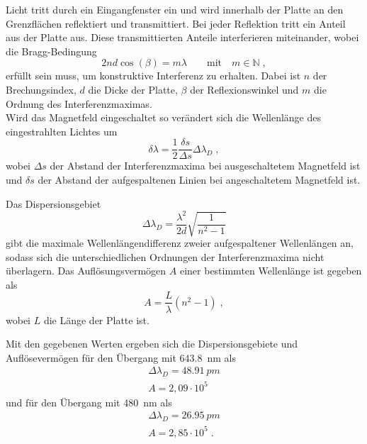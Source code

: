         Licht tritt durch ein Eingangfenster ein und wird innerhalb der Platte an den Grenzflächen reflektiert und transmittiert.
        Bei jeder Reflektion tritt ein Anteil aus der Platte aus.
        Diese transmittierten Anteile interferieren miteinander, wobei die Bragg-Bedingung
        \begin{equation}
            2 n d \cos(\beta) = m \lambda \qquad \text{mit} \quad m \in \mathbb{N} \;,
        \end{equation}
        erfüllt sein muss, um konstruktive Interferenz zu erhalten.
        Dabei ist $n$ der Brechungsindex, $d$ die Dicke der Platte, $\beta$ der Reflexionswinkel und $m$ die Ordnung des Interferenzmaximas.
        \\
        
        Wird das Magnetfeld eingeschaltet so verändert sich die Wellenlänge des eingestrahlten Lichtes um
        \begin{equation}
            \delta \lambda = \frac{1}{2} \frac{\delta s}{\Delta s} \Delta \lambda_D \;,
            \label{eqn:lambda}
        \end{equation}
        wobei $\Delta s$ der Abstand der Interferenzmaxima bei ausgeschaltetem Magnetfeld ist und $\delta s$ der Abstand der aufgespaltenen Linien bei angeschaltetem Magnetfeld ist.

        Das Dispersionsgebiet
        \begin{equation}
            \Delta \lambda_D = \frac{\lambda^2}{2 d} \sqrt{\frac{1}{n^2 - 1}}
        \end{equation}
        gibt die maximale Wellenlängendifferenz zweier aufgespaltener Wellenlängen an, sodass sich die unterschiedlichen Ordnungen der Interferenzmaxima nicht überlagern.
        Das Auflösungsvermögen $A$ einer bestimmten Wellenlänge ist gegeben als
        \begin{equation}
            A = \frac{L}{\lambda} (n^2 - 1) \;,
        \end{equation}
        wobei $L$ die Länge der Platte ist.
        
        Mit den gegebenen Werten ergeben sich die Dispersionsgebiete und Auflösevermögen für den Übergang mit \SI{643,8}{nm} als
        \begin{align*}
            \Delta \lambda_D = \SI{48,91}{pm} \\
            A = 2,09 \cdot 10^5
        \end{align*}
        und für den Übergang mit \SI{480}{nm} als
        \begin{align*}
            \Delta \lambda_D = \SI{26,95}{pm} \\
            A = 2,85 \cdot 10^5 \;.
        \end{align*}
